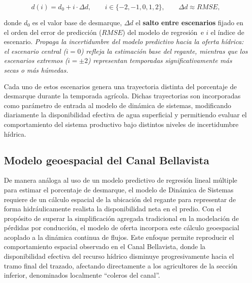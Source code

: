 \documentclass[12pt]{report}
\begin{document}
\vspace{0.2cm}

\[
d(i)=d_0+i\cdot \Delta d,
\qquad
i\in\{-2,-1,0,1,2\},
\qquad
\Delta d \approx RMSE,
\]

\vspace{0.2cm}

donde $d_0$ es el valor base de desmarque, $\Delta d$ el \textbf{salto entre escenarios} \textemdash fijado en el orden del error de predicción ($RMSE$) del modelo de regresión\textemdash\ e $i$ el índice de escenario. \textit{Propaga la incertidumbre del modelo predictivo hacia la oferta hídrica: el escenario central ($i=0$) refleja la estimación base del regante, mientras que los escenarios extremos ($i=\pm 2$) representan temporadas significativamente más secas o más húmedas.}

\vspace{0.2cm}

Cada uno de estos escenarios genera una trayectoria distinta del porcentaje de desmarque durante la temporada agrícola. Dichas trayectorias son incorporadas como parámetro de entrada al modelo de dinámica de sistemas, modificando diariamente la disponibilidad efectiva de agua superficial y permitiendo evaluar el comportamiento del sistema productivo bajo distintos niveles de incertidumbre hídrica.

\subsection{Modelo geoespacial del Canal Bellavista}

De manera análoga al uso de un modelo predictivo de regresión lineal múltiple para estimar el porcentaje de desmarque, el modelo de Dinámica de Sistemas requiere de un cálculo espacial de la ubicación del regante para representar de forma hidráulicamente realista la disponibilidad neta en el predio. Con el propósito de superar la simplificación agregada tradicional en la modelación de pérdidas por conducción, el modelo de oferta incorpora este cálculo geoespacial acoplado a la dinámica continua de flujos. Este enfoque permite reproducir el comportamiento espacial observado en el Canal Bellavista, donde la disponibilidad efectiva del recurso hídrico disminuye progresivamente hacia el tramo final del trazado, afectando directamente a los agricultores de la sección inferior, denominados localmente ``coleros del canal''.
\end{document}

